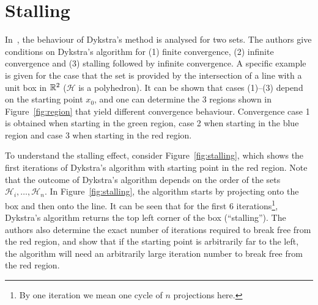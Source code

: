 \documentclass[hidelinks]{article}
\begin{document}
\section{Stalling}
%
In~\cite{DYKSTRASTALLING}, the behaviour of Dykstra's method is analysed for two sets. The authors give conditions on Dykstra's algorithm for (1) finite convergence, (2) infinite convergence and (3) stalling followed by infinite convergence. 
%
A specific example is given for the case that the set is provided by the intersection of a line with a unit box in $\mathbb{R}^2$ ($\mathcal{H}$ is a polyhedron). It can be shown that cases (1)--(3) depend on the starting point $x_0$, and one can determine the 3 regions shown in Figure~\ref{fig:region} that yield different convergence behaviour. Convergence case 1 is obtained when starting in the green region, case 2 when starting in the blue region and case 3 when starting in the red region.
%
\par To understand the stalling effect, consider Figure~\ref{fig:stalling}, which shows the first iterations of Dykstra's algorithm with starting point in the red region. Note that the outcome of Dykstra's algorithm depends on the order of the sets $\mathcal{H}_i,\dots,\mathcal{H}_n$. In Figure~\ref{fig:stalling}, the algorithm starts by projecting onto the box and then onto the line. It can be seen that for the first 6 iterations\footnote{By one iteration we mean one cycle of $n$ projections here.}, Dykstra's algorithm returns the top left corner of the box (``stalling''). The authors also determine the exact number of iterations required to break free from the red region, and show that if the starting point is arbitrarily far to the left, the algorithm will need an arbitrarily large iteration number to break free from the red region.
%
\end{document}

